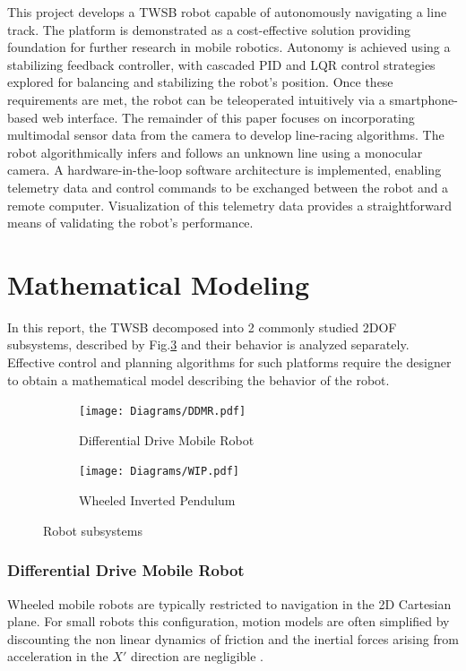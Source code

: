     This project develops a TWSB robot capable of autonomously navigating a line track.
    The platform is demonstrated as a cost-effective solution providing foundation for further research in mobile robotics.
    Autonomy is achieved using a stabilizing feedback controller, with cascaded PID and 
    LQR control strategies explored for balancing and stabilizing the robot's position. 
    Once these requirements are met, the robot can be teleoperated intuitively via a 
    smartphone-based web interface. The remainder of this paper focuses on incorporating 
    multimodal sensor data from the camera to develop line-racing algorithms.
    The robot algorithmically infers and follows an unknown line using a monocular camera. 
    A hardware-in-the-loop software architecture is implemented, enabling telemetry data and control 
    commands to be exchanged between the robot and a remote computer. Visualization of this telemetry
    data provides a straightforward means of validating the robot's performance.
    \pagebreak{}

    \section{Mathematical Modeling} %
    In this report, the TWSB decomposed into 2 commonly studied 2DOF subsystems, described by Fig.\ref{fig:2DOF} and their behavior is analyzed
    separately.
    Effective control and planning algorithms for such platforms require the designer to obtain a mathematical model describing the behavior
    of the robot.  
    \begin{figure}[h]
        \centering
        \begin{subfigure}[b]{0.4\textwidth}
            \texttt{[image: Diagrams/DDMR.pdf]}
            \caption{Differential Drive Mobile Robot}
            \label{fig:DDMR}
        \end{subfigure}
        \hfill
        \begin{subfigure}[b]{0.4\textwidth}
            \texttt{[image: Diagrams/WIP.pdf]}
            \caption{Wheeled Inverted Pendulum}
            \label{fig:WIP}
        \end{subfigure}        
        \caption{Robot subsystems}
        \label{fig:2DOF}
    \end{figure}


    \subsubsection{Differential Drive Mobile Robot}
    Wheeled mobile robots are typically restricted to navigation in the 2D Cartesian plane. For small robots 
    this configuration, motion models are often simplified by discounting the non linear dynamics of friction and 
    the inertial forces arising from acceleration in the $X'$ direction are negligible \cite{KinematicWheeled}. 


